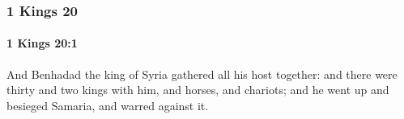 	\subsubsection{1 Kings 20} %
		\label{1KINGS-20}

		\paragraph{1 Kings 20:1} %
			\label{1KINGS-20-1}

			And Benhadad the king of Syria gathered all his host together: and there were thirty and two kings with him, and horses, and chariots; and he went up and besieged Samaria, and warred against it.


